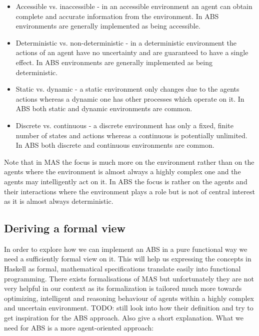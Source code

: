 \begin{itemize}
	\item Accessible vs. inaccessible - in an accessible environment an agent can obtain complete and accurate information from the environment. In ABS environments are generally implemented as being accessible.
	\item Deterministic vs. non-deterministic - in a deterministic environment the actions of an agent have no uncertainty and are guaranteed to have a single effect. In ABS environments are generally implemented as being deterministic.
	\item Static vs. dynamic - a static environment only changes due to the agents actions whereas a dynamic one has other processes which operate on it. In ABS both static and dynamic environments are common.
	\item Discrete vs. continuous - a discrete environment has only a fixed, finite number of states and actions whereas a continuous is potentially unlimited. In ABS both discrete and continuous environments are common.
\end{itemize}

Note that in MAS the focus is much more on the environment rather than on the agents where the environment is almost always a highly complex one and the agents may intelligently act on it. In ABS the focus is rather on the agents and their interactions where the environment plays a role but is not of central interest as it is almost always deterministic.

\subsection{Deriving a formal view}
In order to explore how we can implement an ABS in a pure functional way we need a sufficiently formal view on it. This will help us expressing the concepts in Haskell as formal, mathematical specifications translate easily into functional programming. There exists formalisations of MAS \cite{wooldridge_introduction_2009} but unfortunately they are not very helpful in our context as its formalization is tailored much more towards optimizing, intelligent and reasoning behaviour of agents within a highly complex and uncertain environment. TODO: still look into how their definition and try to get inspiration for the ABS approach. Also give a short explanation.
What we need for ABS is a more agent-oriented approach: 

